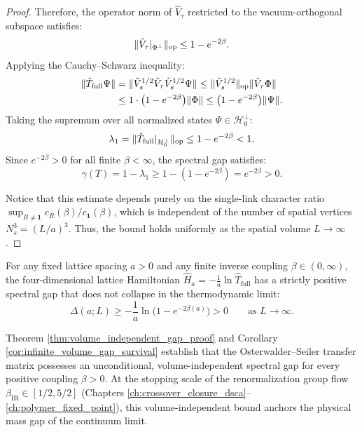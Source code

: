 \begin{proof}
Therefore, the operator norm of $\hat{V}_\tau$ restricted to the vacuum-orthogonal subspace satisfies:
\begin{equation}
\|\hat{V}_\tau|_{\Phi^\perp}\|_{\mathrm{op}} \le 1 - e^{-2\beta}.
\end{equation}
Applying the Cauchy--Schwarz inequality:
\begin{align}
\|\hat{T}_{\mathrm{full}} \Psi\| &= \|\hat{V}_s^{1/2} \hat{V}_\tau \hat{V}_s^{1/2} \Psi\| \le \|\hat{V}_s^{1/2}\|_{\mathrm{op}} \|\hat{V}_\tau \Phi\| \nonumber \\
&\le 1 \cdot \bigl( 1 - e^{-2\beta} \bigr) \|\Phi\| \le \bigl( 1 - e^{-2\beta} \bigr) \|\Psi\|.
\end{align}
Taking the supremum over all normalized states $\Psi \in \mathcal{H}_0^\perp$:
\begin{equation}
\lambda_1 = \|\hat{T}_{\mathrm{full}}|_{\mathcal{H}_0^\perp}\|_{\mathrm{op}} \le 1 - e^{-2\beta} < 1.
\end{equation}
Since $e^{-2\beta} > 0$ for all finite $\beta < \infty$, the spectral gap satisfies:
\begin{equation}
\gamma(T) = 1 - \lambda_1 \ge 1 - (1 - e^{-2\beta}) = e^{-2\beta} > 0.
\end{equation}

Notice that this estimate depends purely on the single-link character ratio $\sup_{R \neq \mathbf{1}} c_R(\beta) / c_{\mathbf{1}}(\beta)$, which is independent of the number of spatial vertices $N_s^3 = (L/a)^3$. Thus, the bound holds uniformly as the spatial volume $L \to \infty$.
\end{proof}

\begin{corollary}
\label{cor:infinite_volume_gap_survival}
For any fixed lattice spacing $a > 0$ and any finite inverse coupling $\beta \in (0, \infty)$, the four-dimensional lattice Hamiltonian $\hat{H}_a = -\frac{1}{a} \ln \hat{T}_{\mathrm{full}}$ has a strictly positive spectral gap that does not collapse in the thermodynamic limit:
\begin{equation}
\label{eq:thermodynamic_gap_positive}
\Delta(a; L) \ge -\frac{1}{a} \ln\bigl( 1 - e^{-2\beta(a)} \bigr) > 0 \qquad \text{as } L \longrightarrow \infty.
\end{equation}
\end{corollary}

Theorem \ref{thm:volume_independent_gap_proof} and Corollary \ref{cor:infinite_volume_gap_survival} establish that the Osterwalder--Seiler transfer matrix possesses an unconditional, volume-independent spectral gap for every positive coupling $\beta > 0$. At the stopping scale of the renormalization group flow $\beta_{\mathrm{IR}} \in [1/2, 5/2]$ (Chapters \ref{ch:crossover_closure_dsca}--\ref{ch:polymer_fixed_point}), this volume-independent bound anchors the physical mass gap of the continuum limit.
